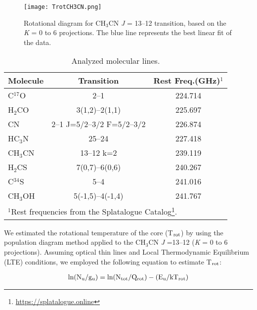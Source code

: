 \documentclass[baaa]{baaa}
\begin{document}
\begin{figure}[h!]
    \centering
    \texttt{[image: TrotCH3CN.png]}
    \caption{Rotational diagram for CH$_{3}$CN \textit{J} = 13--12 transition, based on the \textit{K} = 0 to 6 projections. The blue line represents the best linear fit of the data.}
    \label{trot}
\end{figure}



\begin{table}
\caption{Analyzed molecular lines.}
\centering
\tiny
\begin{tabular}{lcc}
\hline\hline\noalign{\smallskip}
Molecule    & Transition &  Rest Freq.(GHz)$^{1}$        \\
\hline\noalign{\smallskip}
C$^{17}$O   & 2--1            & 224.714               \\             
H$_{2}$CO   & 3(1,2)--2(1,1)            & 225.697               \\             
CN   & 2--1 J=5/2--3/2 F=5/2--3/2       & 226.874               \\             
HC$_{3}$N   & 25--24            & 227.418               \\             
CH$_{3}$CN           & 13--12 k=2 & 239.119           \\
H$_{2}$CS           & 7(0,7)--6(0,6) & 240.267           \\
C$^{34}$S           & 5--4 & 241.016           \\
CH$_{3}$OH                & 5(-1,5)--4(-1,4)         & 241.767                    \\
\hline

\multicolumn{3}{l}{$^{1}$Rest frequencies from the {Splatalogue Catalog}\footnote{\url{https://splatalogue.online}}.}\\
\end{tabular}
\label{table}
\end{table}

We estimated the rotational temperature of the core (T$\rm_{rot}$) by using the population diagram method \citep{goldsmith99} applied to the CH$_{3}$CN \textit{J} =13--12 (\textit{K} = 0 to 6 projections). Assuming optical thin lines and Local Thermodynamic Equilibrium (LTE) conditions, we employed the following equation to estimate T$\rm_{rot}$:

\begin{align}
{\rm ln(N_u/g_u}) = {\rm ln(N_{tot}/Q_{rot})-(E_u/kT_{rot})}
     \label{RotDia}    
\end{align}
\end{document}
